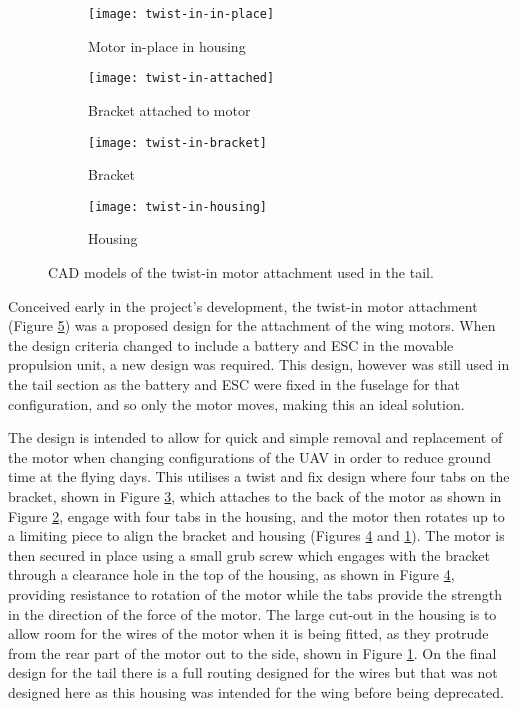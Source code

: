 \documentclass[../../main.tex]{subfiles}
\begin{document}
\begin{figure}[H]
    \centering
    \begin{subfigure}[b]{0.49\columnwidth}
        \centering
        \texttt{[image: twist-in-in-place]}
        \caption{Motor in-place in housing}
        \label{fig:twist-in:in-place}
    \end{subfigure}
    \hfill
    \begin{subfigure}[b]{0.49\columnwidth}
        \centering
        \texttt{[image: twist-in-attached]}
        \caption{Bracket attached to motor}
        \label{fig:twist-in:attached}
    \end{subfigure}

    \begin{subfigure}[b]{0.49\columnwidth}
        \centering
        \texttt{[image: twist-in-bracket]}
        \caption{Bracket}
        \label{fig:twist-in:bracket}
    \end{subfigure}
    \hfill
    \begin{subfigure}[b]{0.49\columnwidth}
        \centering
        \texttt{[image: twist-in-housing]}
        \caption{Housing}
        \label{fig:twist-in:housing}
    \end{subfigure}
    \caption{CAD models of the twist-in motor attachment used in the tail.}
    \label{fig:twist-in}
\end{figure}

Conceived early in the project's development, the twist-in motor attachment (Figure \ref{fig:twist-in}) was a proposed design for the attachment of the wing motors.
When the design criteria changed to include a battery and ESC in the movable propulsion unit, a new design was required.
This design, however was still used in the tail section as the battery and ESC were fixed in the fuselage for that configuration, and so only the motor moves, making this an ideal solution.

The design is intended to allow for quick and simple removal and replacement of the motor when changing configurations of the UAV in order to reduce ground time at the flying days.
This utilises a twist and fix design where four tabs on the bracket, shown in Figure \ref{fig:twist-in:bracket}, which attaches to the back of the motor as shown in Figure \ref{fig:twist-in:attached}, engage with four tabs in the housing, and the motor then rotates up to a limiting piece to align the bracket and housing (Figures \ref{fig:twist-in:housing} and \ref{fig:twist-in:in-place}).
The motor is then secured in place using a small grub screw which engages with the bracket through a clearance hole in the top of the housing, as shown in Figure \ref{fig:twist-in:housing}, providing resistance to rotation of the motor while the tabs provide the strength in the direction of the force of the motor.
The large cut-out in the housing is to allow room for the wires of the motor when it is being fitted, as they protrude from the rear part of the motor out to the side, shown in Figure \ref{fig:twist-in:in-place}.
On the final design for the tail there is a full routing designed for the wires but that was not designed here as this housing was intended for the wing before being deprecated.
\end{document}
